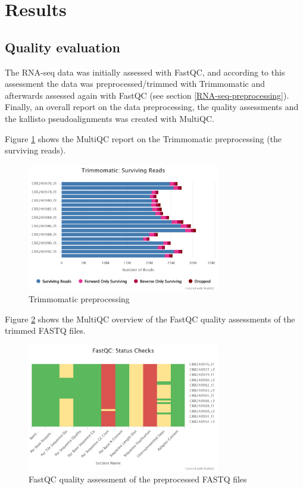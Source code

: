 \section{Results}

\subsection{Quality evaluation}

The RNA-seq data was initially assessed with FastQC, and according to this assessment the data was preprocessed/trimmed with Trimmomatic and afterwards assessed again with FastQC (see section \ref{RNA-seq-preprocessing}). Finally, an overall report on the data preprocessing, the quality assessments and the kallisto pseudoalignments was created with MultiQC.

Figure \ref{fig:0.1-MultiQC_FastQC_status_checks} shows the MultiQC report on the Trimmomatic preprocessing (the surviving reads).

\begin{figure}[htbp]
    \caption{Trimmomatic preprocessing}
    \label{fig:0.1-MultiQC_FastQC_status_checks}
    \includegraphics[width=0.75\textwidth]{../../results/multiqc/Plot-Exports/trimmomatic-surviving_reads}
\end{figure}

Figure \ref{fig:0.2-MultiQC_FastQC_status_checks} shows the MultiQC overview of the FastQC quality assessments of the trimmed FASTQ files.

\begin{figure}[htbp]
    \caption{FastQC quality assessment of the preprocessed FASTQ files}
    \label{fig:0.2-MultiQC_FastQC_status_checks}
    \includegraphics[width=0.75\textwidth]{../../results/multiqc/Plot-Exports/fastqc-status-check-heatmap}
\end{figure}

